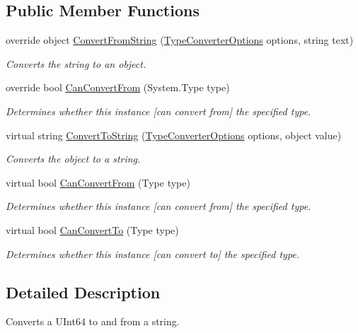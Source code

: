 \subsection*{Public Member Functions}
\begin{DoxyCompactItemize}
\item 
override object \hyperlink{a00164_a1d3e86ea3d34de0d47a365c9b8622eb7}{Convert\-From\-String} (\hyperlink{a00158}{Type\-Converter\-Options} options, string text)
\begin{DoxyCompactList}\small\item\em Converts the string to an object. \end{DoxyCompactList}\item 
override bool \hyperlink{a00164_a3d9e9527b77fbf94786f2e5b8c4e5829}{Can\-Convert\-From} (System.\-Type type)
\begin{DoxyCompactList}\small\item\em Determines whether this instance \mbox{[}can convert from\mbox{]} the specified type. \end{DoxyCompactList}\item 
virtual string \hyperlink{a00086_a36cb2f9b24f15a671293f3a722324c27}{Convert\-To\-String} (\hyperlink{a00158}{Type\-Converter\-Options} options, object value)
\begin{DoxyCompactList}\small\item\em Converts the object to a string. \end{DoxyCompactList}\item 
virtual bool \hyperlink{a00086_a470d21adaa704eb281250dbd112ff91a}{Can\-Convert\-From} (Type type)
\begin{DoxyCompactList}\small\item\em Determines whether this instance \mbox{[}can convert from\mbox{]} the specified type. \end{DoxyCompactList}\item 
virtual bool \hyperlink{a00086_acb65bd8c8199d88d5b1629ae35d18514}{Can\-Convert\-To} (Type type)
\begin{DoxyCompactList}\small\item\em Determines whether this instance \mbox{[}can convert to\mbox{]} the specified type. \end{DoxyCompactList}\end{DoxyCompactItemize}


\subsection{Detailed Description}
Converts a U\-Int64 to and from a string. 



